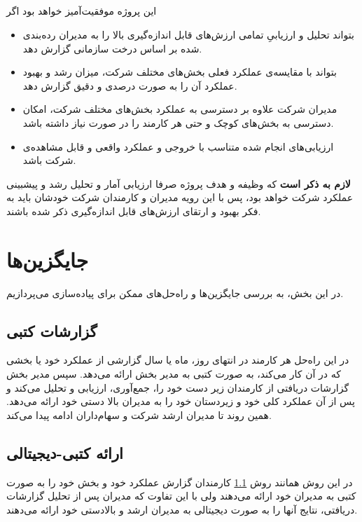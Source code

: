 \documentclass[12pt]{article}
\begin{document}
\subsection{}
این پروژه موفقیت‌آمیز خواهد بود اگر
\begin{itemize}
    \item 
    بتواند تحلیل و ارزیابیِ تمامی ارزش‌های قابل‌ اندازه‌گیری بالا را به مدیران رده‌بندی‌ شده بر اساس درخت سازمانی گزارش دهد.
    \item 
    بتواند با مقایسه‌ی عملکرد فعلی بخش‌های مختلف شرکت، میزان رشد و بهبود عملکرد آن را به صورت درصدی و دقیق گزارش دهد.
    \item
    مدیران شرکت علاوه‌ بر دسترسی به عملکرد بخش‌های مختلف شرکت، امکان دسترسی به بخش‌های کوچک و حتی هر کارمند را در صورت نیاز داشته باشد.

    \item 
    ارزیابی‌های انجام شده متناسب‌ با خروجی و عملکرد واقعی و قابل مشاهده‌ی شرکت باشد.
\end{itemize}

\textbf{لازم به ذکر است}
 که وظیفه و هدف پروژه صرفا ارزیابی آمار و تحلیل رشد و پیشبینی عملکرد شرکت خواهد بود، پس با این رویه مدیران و کارمندان شرکت خودشان باید به فکر بهبود و ارتقای ارزش‌های قابل اندازه‌گیری ذکر شده باشند.

\section{جایگزین‌ها}
در این بخش، به بررسی جایگزین‌ها و راه‌حل‌های ممکن برای پیاده‌سازی  می‌پردازیم.

\subsection{گزارشات کتبی}\label{written-report}
در این راه‌حل هر کارمند در انتهای روز، ماه یا سال گزارشی از عملکرد خود یا بخشی که در آن کار می‌کند، به صورت کتبی به مدیر بخش ارائه می‌دهد. سپس مدیر بخش گزارشات دریافتی از کارمندان زیر دست خود را، جمع‌آوری، ارزیابی و تحلیل می‌کند و پس از آن عملکرد کلی خود و زیردستان خود را به مدیران بالا دستی خود ارائه می‌دهد.
همین روند تا مدیران ارشد شرکت و سهام‌داران ادامه پیدا می‌کند.
\subsection{ارائه کتبی-دیجیتالی}\label{half-digital}
در این روش همانند روش 
\ref{written-report}
کارمندان گزارش عملکرد خود و بخش خود را به صورت کتبی به مدیران خود ارائه می‌دهند ولی با این تفاوت که مدیران پس از تحلیل گزارشات دریافتی، نتایج آنها را به صورت دیجیتالی به مدیران ارشد و بالادستی خود ارائه می‌دهند.
\end{document}
